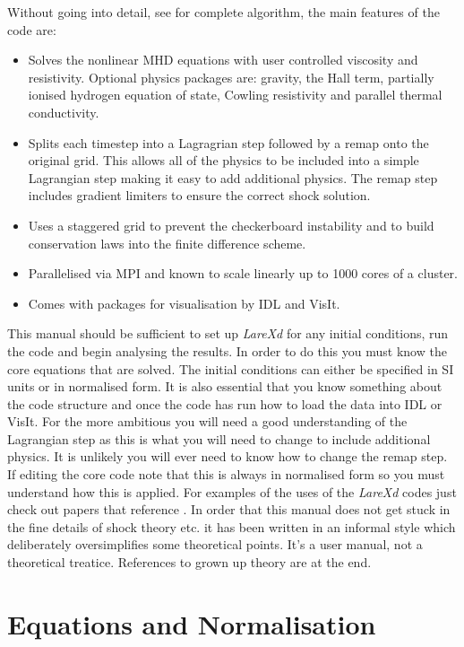 \documentclass[11pt]{article}
\begin{document}
Without going into detail, see \cite{jcp} for complete algorithm, the main features of the code are:
\begin{itemize}
 \item Solves the nonlinear MHD equations with user controlled viscosity and resistivity. Optional physics packages are: gravity, the Hall term, partially ionised hydrogen equation of state, Cowling resistivity and parallel thermal conductivity.
 \item Splits each timestep into a Lagragrian step followed by a remap onto the original grid. This allows all of the physics to be included into a simple Lagrangian step making it easy to add additional physics. The remap step includes gradient limiters to ensure the correct shock solution.
 \item Uses a staggered grid to prevent the checkerboard instability and to build conservation laws into the finite difference scheme.
 \item Parallelised via MPI and known to scale linearly up to 1000 cores of a cluster.
 \item Comes with packages for visualisation by IDL and VisIt. \cite{visit}
\end{itemize}

This manual should be sufficient to set up {\it LareXd} for any initial conditions, run the code and begin analysing the results. In order to do this you must know the core equations that are solved. The initial conditions can either be specified in SI units or in normalised form. It is also essential that you know something about the code structure and once the code has run how to load the data into IDL or VisIt. For the more ambitious you will need a good understanding of the Lagrangian step as this is what you will need to change to include additional physics. It is unlikely you will ever need to know how to change the remap step. If editing the core code note that this is always in normalised form so you must understand how this is applied. For examples of the uses of the {\it LareXd} codes just check out papers that reference \cite{jcp}. In order that this manual does not get stuck in the fine details of shock theory etc. it has been written in an informal style which deliberately oversimplifies some theoretical points. It's a user manual, not a theoretical treatice. References to grown up theory are at the end. 



\section{Equations and Normalisation}
\end{document}
